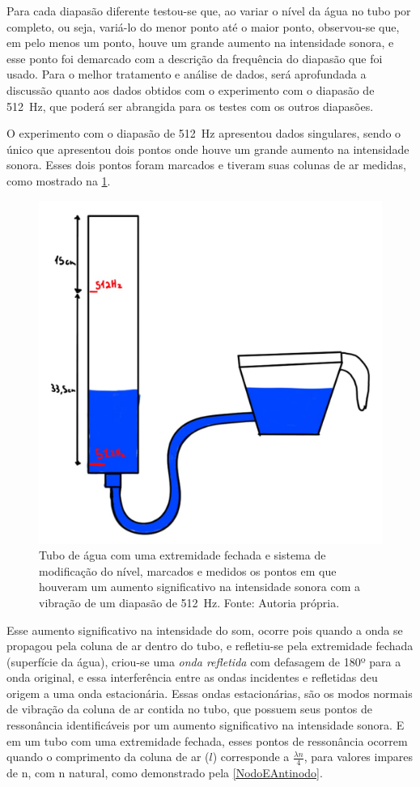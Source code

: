 Para cada diapasão diferente testou-se que, ao variar o nível da água no tubo por completo, ou seja, variá-lo do menor ponto até o maior ponto, observou-se que, em pelo menos um ponto, houve um grande aumento na intensidade sonora, e esse ponto foi demarcado com a descrição da frequência do diapasão que foi usado. Para o melhor tratamento e análise de dados, será aprofundada a discussão quanto aos dados obtidos com o experimento com o diapasão de \qty{512}{Hz}, que poderá ser abrangida para os testes com os outros diapasões.

O experimento com o diapasão de \qty{512}{Hz} apresentou dados singulares, sendo o único que apresentou dois pontos onde houve um grande aumento na intensidade sonora.  Esses dois pontos foram marcados e tiveram suas colunas de ar medidas, como mostrado na \cref{TuboFechado}.
\begin{figure}[H]
    \centering
    \includegraphics[width=0.35\linewidth]{fig/TuboFechado.png}
    \caption{Tubo de água com uma extremidade fechada e sistema de modificação do nível, marcados e medidos os pontos em que houveram um aumento significativo na intensidade sonora com a vibração de um diapasão de \qty{512}{Hz}. Fonte: Autoria própria.}
    \label{TuboFechado}
\end{figure}

Esse aumento significativo na intensidade do som, ocorre pois quando a onda se propagou pela coluna de ar dentro do tubo, e refletiu-se pela extremidade fechada (superfície da água), criou-se uma \textit{onda refletida} com defasagem de 180º para a onda original, e essa interferência entre as ondas incidentes e refletidas deu origem a uma onda estacionária. Essas ondas estacionárias, são os modos normais de vibração da coluna de ar contida no tubo, que possuem seus pontos de ressonância identificáveis por um aumento significativo na intensidade sonora. E em um tubo com uma extremidade fechada, esses pontos de ressonância ocorrem quando o comprimento da coluna de ar (\(l\)) corresponde a \(\frac{\lambda n}{4}\), para valores impares de n, com n natural, como demonstrado pela \cref{NodoEAntinodo}. 

